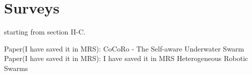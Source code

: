 \documentclass{article}
\begin{document}
	\section{Surveys}
	\cite{lewis-2011-a-survey-of-self-awareness-and-its-application-in-computing-systems} starting from section II-C.
	
	Paper(I have saved it in MRS): CoCoRo - The Self-aware Underwater Swarm
	Paper(I have saved it in MRS): I have saved it in MRS Heterogeneous Robotic Swarms
	
\end{document}
